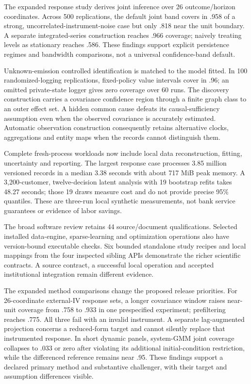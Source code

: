\documentclass[11pt,a4paper,openany]{book}
\begin{document}
The expanded response study derives joint inference over 26 outcome/horizon
coordinates. Across 500 replications, the default joint band covers in .958
of a strong, uncorrelated-instrument-noise case but only .818 near the unit
boundary. A separate integrated-series construction reaches .966 coverage;
naively treating levels as stationary reaches .586. These findings support
explicit persistence regimes and bandwidth comparisons, not a universal
confidence-band default.

Unknown-emission controlled identification is matched to the model fitted.
In 100 randomized-logging replications, fixed-policy value intervals cover
in .96; an omitted private-state logger gives zero coverage over 60 runs.
The discovery construction carries a covariance confidence region through
a finite graph class to an outer effect set. A hidden common cause defeats
its causal-sufficiency assumption even when the observed covariance is
accurately estimated. Automatic observation construction consequently
retains alternative clocks, aggregations and entity maps when the records
cannot distinguish them.

Complete fresh-process workloads now include local data reconstruction,
fitting, uncertainty and reporting. The largest response case processes
3.85 million versioned records in a median 3.38 seconds with about 717 MiB
peak memory. A 3,200-customer, twelve-decision latent analysis with 19
bootstrap refits takes 48.27 seconds; those 19 draws measure cost and do
not provide precise 95\% quantiles. These are three-run local synthetic
measurements, not bank service guarantees or evidence of labor savings.

The broad software review retains 44 source/document qualifications.
Selected installed data-engine, sparse-learning and optimization operations
also have version-bound executable checks. Six bounded standalone study
recipes and local mappings from the four inspected sibling APIs demonstrate
the richer scientific contracts. A source contract, a successful local
operation and accepted institutional integration remain different evidence.

The expanded method comparisons change the proposed release priorities.
For 26-coordinate external-IV response sets, a longer covariance window
raises near-unit coverage from .758 to .933 in one prespecified experiment;
prefiltering reaches .775. All three fail with an invalid instrument. A
separate lag-augmented projection concerns a reduced-form target and cannot
silently replace that instrumented response. In short dynamic panels,
system-GMM joint coverage collapses to .033 or zero after violating its
additional initial-condition restriction, while the differenced reference
remains near .95. These findings support a declared primary method and
substantive challenger, with their target and assumption differences visible.
\end{document}

